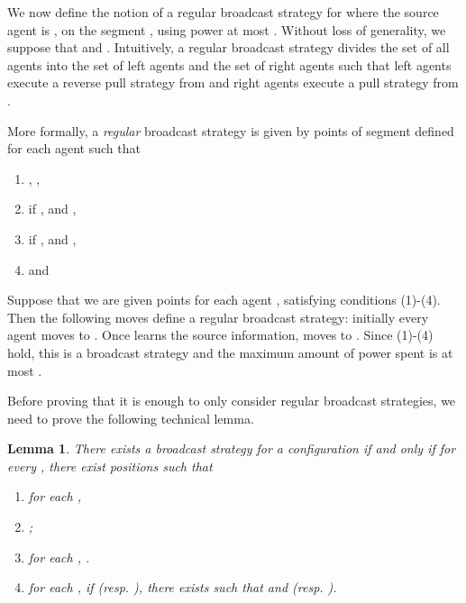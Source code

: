 \documentclass{article}
\newtheorem{lemma}{Lemma}
\begin{document}
We now define the notion of a regular broadcast strategy for  where the source agent is , on the segment , using power at most . Without loss of generality, we suppose that  and . Intuitively, a regular broadcast strategy divides the set of all agents into the set of left agents and the set of right agents such that left agents execute a reverse pull strategy from  and right agents execute a pull strategy from .

More formally, a \emph{regular} broadcast strategy is given by points  of segment  defined for each agent  such that
\begin{enumerate}
\item , ,
\item if ,  and ,
\item if ,  and ,
\item  and  
\end{enumerate}
Suppose that we are given points  for each agent , satisfying conditions (1)-(4).
Then the following moves define a regular broadcast strategy:
 initially every agent
 moves to . Once  learns the source information,  moves to . Since (1)-(4) hold, this is a broadcast strategy and the maximum amount of power spent is at most . 

Before proving that it is enough to only consider regular broadcast strategies, we need to prove the following technical lemma. 

\begin{lemma}\label{lem-strat1-broadcast}
There exists a broadcast strategy  for a configuration
 if and only if for every , there exist positions
 such that
\begin{enumerate}[(1)]
\item  for each ,  
\item ;
\item for each , .
\item for each , if  (resp. ), there
  exists  such that  and  (resp. ).
\end{enumerate}
\end{lemma}
\end{document}
